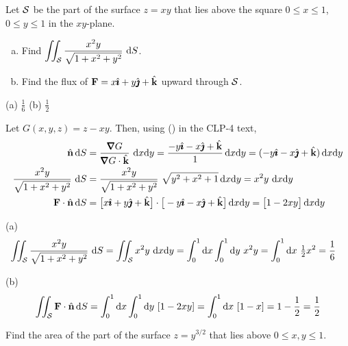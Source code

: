 \begin{question}[M317 1999A] %
Let $\mathcal{S}$ be the part of the surface $z=xy$ that
lies above the square $0\le x\le 1$, $0\le y\le 1$ in the $xy$-plane.
\begin{enumerate}[(a)]
\item
Find $\displaystyle\iint_{\mathcal{S}} \frac{x^2y}{\sqrt{1+x^2+y^2}}\ \mathrm{d}S$.
\item
Find the flux of $\mathbf{F}=x\hat{\pmb{\imath}}+y\hat{\pmb{\jmath}}+\hat{\mathbf{k}}$ upward through $\mathcal{S}$.
\end{enumerate}
\end{question}


\begin{answer} 
(a) $\frac{1}{6}$\qquad
(b) $\frac{1}{2}$
\end{answer}

\begin{solution} 
 Let $G(x,y,z) = z-xy$. Then, using
() in the CLP-4 text,
\begin{align*}
\hn\,\dee{S}&=\frac{\vnabla G}{\vnabla G\cdot\hk}\ \dee{x}\dee{y}
=\frac{-y\hi-x\hj+\hk}{1}\,\dee{x}\dee{y}
=(-y\hi-x\hj+\hk)\,\dee{x}\dee{y}\\
\frac{x^2y}{\sqrt{1+x^2+y^2}}\ \dee{S}
&=\frac{x^2y}{\sqrt{1+x^2+y^2}}\ \sqrt{y^2+x^2+1}\,\dee{x}\dee{y}
=x^2y\ \dee{x}\dee{y}\\
\vF\cdot\hn\,\dee{S}
&=\big[x\hi+y\hj+\hk\big]\cdot\big[-y\hi-x\hj+\hk\big]\,\dee{x}\dee{y}
=\big[1-2xy\big]\,\dee{x}\dee{y}
\end{align*}

(a)
\begin{align*}
\iint_{\mathcal{S}} \frac{x^2y}{\sqrt{1+x^2+y^2}}\ \mathrm{d}S
&=\iint_{\mathcal{S}} x^2y\ \mathrm{d}x\mathrm{d}y
=\int_0^1\mathrm{d}x\int_0^1\mathrm{d}y\ x^2y
=\int_0^1\mathrm{d}x\ \tfrac{1}{2} x^2
=\frac{1}{6}
\end{align*}

(b)
$$
\iint_{\mathcal{S}} \mathbf{F}\cdot\hat{\mathbf{n}}\,\mathrm{d}S
=\int_0^1\mathrm{d}x\int_0^1\mathrm{d}y\ [1-2xy]
=\int_0^1 \mathrm{d}x\ [1-x]
=1-\frac{1}{2}
=\frac{1}{2}
$$
\end{solution}


\begin{question}[M317 2002A] %
 Find the area of the part of the surface $z=y^{3/2}$ that
lies above $0\le x,y\le 1$.
\end{question}


